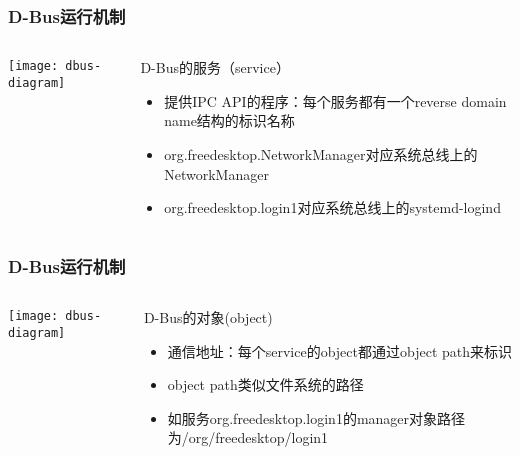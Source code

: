 \begin{frame}[fragile]
	\frametitle{D-Bus运行机制}
	
	\begin{columns}
		\begin{column}{.4\textwidth}
			
			\texttt{[image: dbus-diagram]}
			
		\end{column}
		\begin{column}{.6\textwidth}
			D-Bus的服务（service）
			\begin{itemize}
				\item 提供IPC API的程序：每个服务都有一个reverse domain name结构的标识名称
				\item org.freedesktop.NetworkManager对应系统总线上的NetworkManager
				\item org.freedesktop.login1对应系统总线上的systemd-logind
				
			\end{itemize}
		\end{column}
	\end{columns}
\end{frame}

\begin{frame}[fragile]
	\frametitle{D-Bus运行机制}
	
	\begin{columns}
		\begin{column}{.4\textwidth}
			
			\texttt{[image: dbus-diagram]}
			
		\end{column}
		\begin{column}{.6\textwidth}
			D-Bus的对象(object)
			\begin{itemize}
				\item 通信地址：每个service的object都通过object path来标识
				\item object path类似文件系统的路径
				\item 如服务org.freedesktop.login1的manager对象路径为/org/freedesktop/login1
				
			\end{itemize}
		\end{column}
	\end{columns}
\end{frame}

